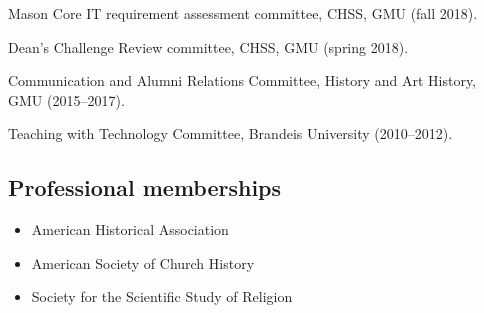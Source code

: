 \documentclass[11pt]{article}
\providecommand{\tightlist}{%
  \setlength{\itemsep}{0pt}\setlength{\parskip}{0pt}}
\begin{document}
Mason Core IT requirement assessment committee, CHSS, GMU (fall 2018).

Dean's Challenge Review committee, CHSS, GMU (spring 2018).

Communication and Alumni Relations Committee, History and Art History, GMU 
(2015--2017).

Teaching with Technology Committee, Brandeis University (2010--2012).





\subsection{Professional memberships}\label{Memberships}

\begin{itemize}
    \tightlist
    \item American Historical Association
    \item American Society of Church History
    \item Society for the Scientific Study of Religion
\end{itemize}
\end{document}
